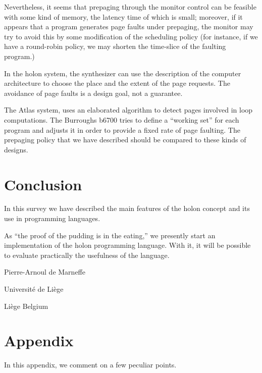 \documentclass[openany,nobib]{tufte-book}
\begin{document}
Nevertheless, it seems that prepaging through the monitor control can be
feasible with some kind of memory, the latency time of which is small;
moreover, if it appears that a program generates page faults under prepaging,
the monitor may try to avoid this by some modification of the scheduling policy
(for instance, if we have a round-robin policy, we may shorten the time-slice
of the faulting program.)

In the holon system, the synthesizer can use the description of the computer
architecture to choose the place and the extent of the page requests. The
avoidance of page faults is a design goal, not a guarantee.

The Atlas system,\autocite{baylis1968paging} uses an elaborated algorithm to
detect pages involved in loop computations. The Burroughs {\sc b}6700 tries to
define a ``working set'' for each program and adjusts it in order to provide a
fixed rate of page faulting.\autocite{fenton1972b6700} The prepaging policy
that we have described should be compared to these kinds of designs.

\chapter{Conclusion}

In this survey we have described the main features of the holon concept and its
use in programming languages.

As ``the proof of the pudding is in the eating,'' we presently start an
implementation of the holon programming language. With it, it will be possible
to evaluate practically the usefulness of the language.

\bigskip
\bigskip
\bigskip

\hfill Pierre-Arnoul de Marneffe

\hfill Universit\'e de Li\`ege

\hfill Li\`ege Belgium


\chapter{Appendix}

In this appendix, we comment on a few peculiar points.
\end{document}
